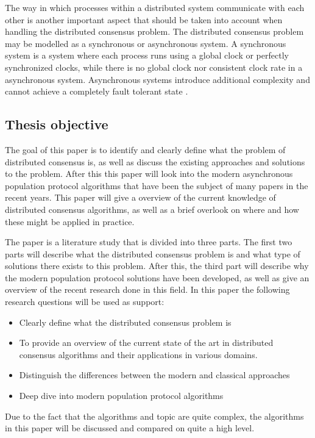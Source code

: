 The way in which processes within a distributed system communicate with each other is another important aspect that should be taken into account when handling the distributed consensus problem. The distributed consensus problem may be modelled as a synchronous or asynchronous system. A synchronous system is a system where each process runs using a global clock or perfectly synchronized clocks, while there is no global clock nor consistent clock rate in a asynchronous system. Asynchronous systems introduce additional complexity and cannot achieve a completely fault tolerant state \cite{fischerImpossibilityDistributedConsensus}.


\clearpage

\subsection{Thesis objective}
The goal of this paper is to identify and clearly define what the problem of distributed consensus is,
as well as discuss the existing approaches and solutions to the problem. After this this paper will look into the modern asynchronous population protocol algorithms that have been the subject of many papers in the recent years. 
This paper will give a overview of the current knowledge of distributed consensus algorithms, as well as a brief overlook on where and how these might be applied in practice.

The paper is a literature study that is divided into three parts. The first two parts will describe what the distributed consensus problem is and what type of solutions there exists to this problem. After this, the third part will describe why the modern population protocol solutions have been developed, as well as give an overview of the recent research done in this field. In this paper the following research questions will be used as support:

\begin{itemize}
    \item Clearly define what the distributed consensus problem is
    \item To provide an overview of the current state of the art in distributed consensus algorithms and their applications in various domains.
    \item Distinguish the differences between the modern and classical approaches
    \item Deep dive into modern population protocol algorithms
\end{itemize}

Due to the fact that the algorithms and topic are quite complex, the algorithms in this paper will be discussed and compared on quite a high level.

\subsection{}

\clearpage